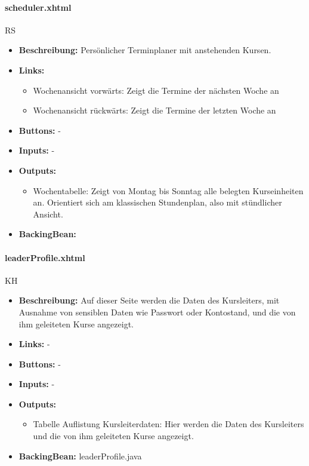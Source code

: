 				\paragraph{scheduler.xhtml}
					RS\\
					\begin{itemize}
						\item \textbf{Beschreibung:} Persönlicher Terminplaner mit anstehenden Kursen.
						\item \textbf{Links:}
							\begin{itemize}
								\item Wochenansicht vorwärts: Zeigt die Termine der nächsten Woche an
								\item Wochenansicht rückwärts:
								Zeigt die Termine der letzten Woche an
							\end{itemize}
						\item \textbf{Buttons:} -
						\item \textbf{Inputs:} -
						\item \textbf{Outputs:}
							\begin{itemize}
								\item Wochentabelle: Zeigt von Montag bis Sonntag alle belegten Kurseinheiten an. Orientiert sich am klassischen Stundenplan, also mit stündlicher Ansicht.
							\end{itemize}
						\item \textbf{BackingBean:}
					\end{itemize}
				
				\paragraph{leaderProfile.xhtml}
					KH\\
					\begin{itemize}
						\item \textbf{Beschreibung:} Auf dieser Seite werden die Daten des Kursleiters, mit Ausnahme von sensiblen Daten wie Passwort oder Kontostand, und die von ihm geleiteten Kurse angezeigt.
						\item \textbf{Links:} -
						\item \textbf{Buttons:} -
						\item \textbf{Inputs:} -
						\item \textbf{Outputs:} 
							\begin{itemize}
								\item Tabelle Auflistung Kursleiterdaten: Hier werden die Daten des Kursleiters und die von ihm geleiteten Kurse angezeigt.
							\end{itemize}
						\item \textbf{BackingBean:} leaderProfile.java
					\end{itemize}
				
